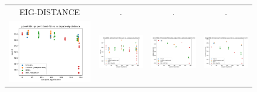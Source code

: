 \begin{figure}
\begin{tabular}{@{\hskip -0.0in}c@{\hskip -0.0in}c@{\hskip -0.0in}c@{\hskip -0.0in}c@{\hskip -0.0in}}
		EIG-DISTANCE & . & . & . \\
		\includegraphics[width=.245\linewidth]{figures/glove400k_qa_best-f1_vs_subspace-eig-distance_linx.pdf} &
		\includegraphics[width=.245\linewidth]{figures/glove400k_sentiment_trec_test-acc_vs_subspace-eig-distance_linx.pdf} &
		\includegraphics[width=.245\linewidth]{figures/glove400k_intrinsics_analogy-avg-score_vs_subspace-eig-distance_linx.pdf} &
		\includegraphics[width=.245\linewidth]{figures/glove400k_intrinsics_similarity-avg-score_vs_subspace-eig-distance_linx.pdf} \\
		

\end{tabular}
\end{figure}
